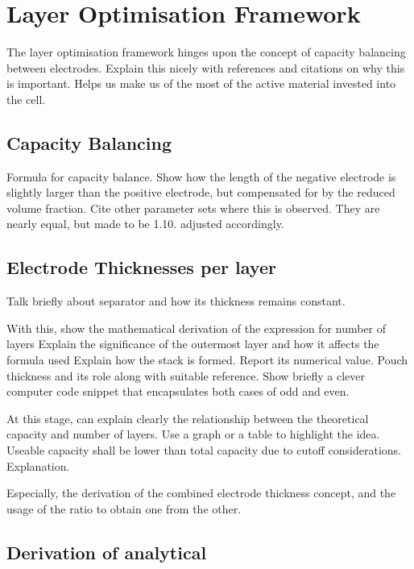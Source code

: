 
\section{Layer Optimisation Framework}

The layer optimisation framework hinges  upon the concept of capacity balancing
between electrodes.  Explain this nicely  with references and citations  on why
this is important. Helps us make us of the most of the active material invested
into the cell.

\subsection{Capacity Balancing}

Formula for capacity balance. Show how  the length of the negative electrode is
slightly larger than the positive electrode, but compensated for by the reduced
volume fraction.  Cite other parameter  sets where  this is observed.  They are
nearly equal, but made to be 1.10.%
adjusted accordingly.

\subsection{Electrode Thicknesses per layer}
Talk briefly about separator and how its thickness remains constant.

With this, show the mathematical derivation of the expression for number of
layers Explain the significance of the outermost layer and how it affects the
formula used Explain how the stack is formed. Report its numerical value. Pouch
thickness and its role along with suitable reference. Show briefly a clever
computer code snippet that encapsulates both cases of odd and even.

At this stage, can explain clearly the relationship between the theoretical
capacity and number of layers. Use a graph or a table to highlight the
idea. Useable capacity shall be lower than total capacity due to cutoff
considerations. Explanation.

Especially, the derivation of the combined electrode thickness concept, and the
usage of the ratio to obtain one from the other.

\subsection{Derivation of analytical }

